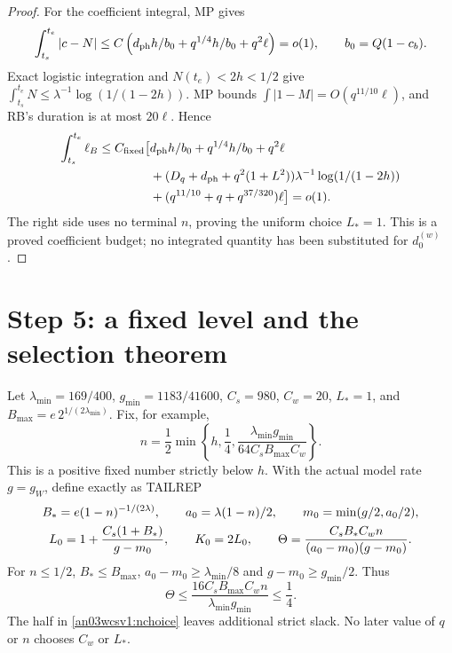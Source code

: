 \documentclass[11pt]{article}
\numberwithin{equation}{section}
\theoremstyle{remark}\newtheorem{remark}[theorem]{Remark}
\begin{document}
\begin{proof}
For the coefficient integral, MP gives
\[
 \int_{t_s}^{t_e}|c-N|
 \le C\left(d_{\rm ph}h/b_0+q^{1/4}h/b_0+q^2\ell\right)=o(1),
 \qquad b_0=Q(1-c_b).
 \]
Exact logistic integration and $N(t_e)<2h<1/2$ give
$\int_{t_s}^{t_e}N\le\lambda^{-1}\log(1/(1-2h))$.
MP bounds $\int|1-M|=O(q^{11/10}\ell)$, and RB's duration
is at most $20\ell$. Hence
\begin{align}
 \int_{t_s}^{t_e}\ell_B
 \le C_{\rm fixed}\big[
 &d_{\rm ph}h/b_0+q^{1/4}h/b_0+q^2\ell\notag\\
 &+(D_q+d_{\rm ph}+q^2(1+L^2))
                      \lambda^{-1}\log(1/(1-2h))\notag\\
 &+(q^{11/10}+q+q^{37/320})\ell\big]=o(1).
 \label{an03wcsv1:integratedledger}
\end{align}
The right side uses no terminal $n$, proving the uniform choice
$L_*=1$. This is a proved coefficient budget; no integrated
quantity has been substituted for $d_0^{(w)}$.
\end{proof}

\section{Step 5: a fixed level and the selection theorem}
\label{an03wcsv1:selectionsection}
Let $\lambda_{\min}=169/400$, $g_{\min}=1183/41600$,
$C_s=980$, $C_w=20$, $L_*=1$, and
$B_{\max}=e\,2^{1/(2\lambda_{\min})}$. Fix, for example,
\begin{equation}
 n=\frac12\min\left\{h,\frac14,
              \frac{\lambda_{\min}g_{\min}}{64C_sB_{\max}C_w}\right\}.
 \label{an03wcsv1:nchoice}
\end{equation}
This is a positive fixed number strictly below $h$.
With the actual model rate $g=g_W$, define exactly as TAILREP
\begin{gather}
 B_*=e(1-n)^{-1/(2\lambda)},\qquad
 a_0=\lambda(1-n)/2,\qquad m_0=\min(g/2,a_0/2),\notag\\
 L_0=1+\frac{C_s(1+B_*)}{g-m_0},\qquad K_0=2L_0,\qquad
 \Theta=\frac{C_sB_*C_wn}{(a_0-m_0)(g-m_0)}.
 \label{an03wcsv1:selectionconstants}
\end{gather}
For $n\le1/2$, $B_*\le B_{\max}$,
$a_0-m_0\ge\lambda_{\min}/8$ and
$g-m_0\ge g_{\min}/2$. Thus
\[
 \Theta\le\frac{16C_sB_{\max}C_wn}{\lambda_{\min}g_{\min}}
 \le\frac14.
\]
The half in \eqref{an03wcsv1:nchoice} leaves additional strict
slack. No later value of $q$ or $n$ chooses $C_w$ or $L_*$.
\end{document}
